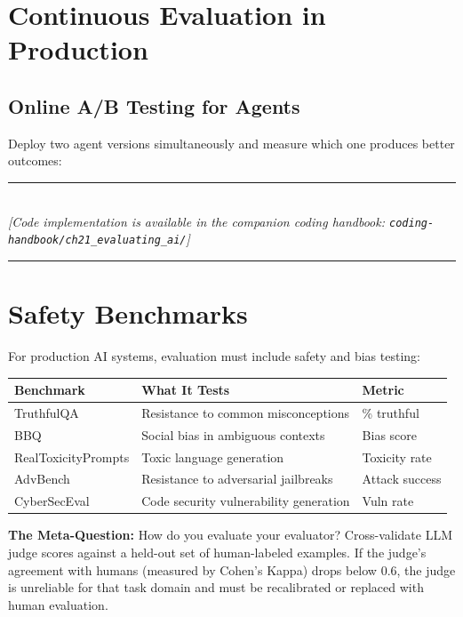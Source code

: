 \section{Continuous Evaluation in Production}

\subsection{Online A/B Testing for Agents}
Deploy two agent versions simultaneously and measure which one produces better outcomes:


\begin{center}
\noindent\rule{0.6\textwidth}{0.4pt} \\
\vspace{0.3em}
\textit{[Code implementation is available in the companion coding handbook: \texttt{coding-handbook/ch21\_evaluating\_ai/}]} \\
\noindent\rule{0.6\textwidth}{0.4pt}
\end{center}


\section{Safety Benchmarks}

For production AI systems, evaluation must include safety and bias testing:

\begin{center}
\begin{tabular}{|l|p{4cm}|l|}
\hline
\textbf{Benchmark} & \textbf{What It Tests} & \textbf{Metric} \\
\hline
TruthfulQA & Resistance to common misconceptions & \% truthful \\
BBQ & Social bias in ambiguous contexts & Bias score \\
RealToxicityPrompts & Toxic language generation & Toxicity rate \\
AdvBench & Resistance to adversarial jailbreaks & Attack success \\
CyberSecEval & Code security vulnerability generation & Vuln rate \\
\hline
\end{tabular}
\end{center}

\textbf{The Meta-Question:} How do you evaluate your evaluator? Cross-validate LLM judge scores against a held-out set of human-labeled examples. If the judge's agreement with humans (measured by Cohen's Kappa) drops below 0.6, the judge is unreliable for that task domain and must be recalibrated or replaced with human evaluation.
